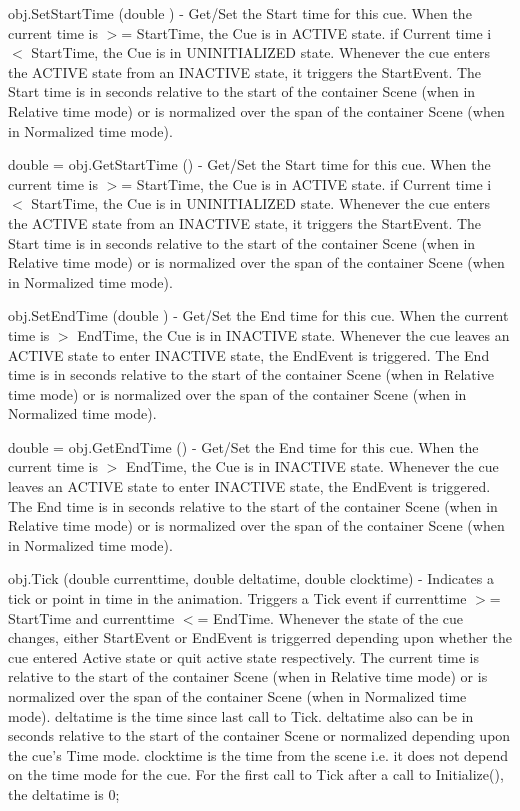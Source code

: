 \begin{DoxyItemize}
\item {\ttfamily obj.\-Set\-Start\-Time (double )} -\/ Get/\-Set the Start time for this cue. When the current time is $>$= Start\-Time, the Cue is in A\-C\-T\-I\-V\-E state. if Current time i $<$ Start\-Time, the Cue is in U\-N\-I\-N\-I\-T\-I\-A\-L\-I\-Z\-E\-D state. Whenever the cue enters the A\-C\-T\-I\-V\-E state from an I\-N\-A\-C\-T\-I\-V\-E state, it triggers the Start\-Event. The Start time is in seconds relative to the start of the container Scene (when in Relative time mode) or is normalized over the span of the container Scene (when in Normalized time mode).  
\item {\ttfamily double = obj.\-Get\-Start\-Time ()} -\/ Get/\-Set the Start time for this cue. When the current time is $>$= Start\-Time, the Cue is in A\-C\-T\-I\-V\-E state. if Current time i $<$ Start\-Time, the Cue is in U\-N\-I\-N\-I\-T\-I\-A\-L\-I\-Z\-E\-D state. Whenever the cue enters the A\-C\-T\-I\-V\-E state from an I\-N\-A\-C\-T\-I\-V\-E state, it triggers the Start\-Event. The Start time is in seconds relative to the start of the container Scene (when in Relative time mode) or is normalized over the span of the container Scene (when in Normalized time mode).  
\item {\ttfamily obj.\-Set\-End\-Time (double )} -\/ Get/\-Set the End time for this cue. When the current time is $>$ End\-Time, the Cue is in I\-N\-A\-C\-T\-I\-V\-E state. Whenever the cue leaves an A\-C\-T\-I\-V\-E state to enter I\-N\-A\-C\-T\-I\-V\-E state, the End\-Event is triggered. The End time is in seconds relative to the start of the container Scene (when in Relative time mode) or is normalized over the span of the container Scene (when in Normalized time mode).  
\item {\ttfamily double = obj.\-Get\-End\-Time ()} -\/ Get/\-Set the End time for this cue. When the current time is $>$ End\-Time, the Cue is in I\-N\-A\-C\-T\-I\-V\-E state. Whenever the cue leaves an A\-C\-T\-I\-V\-E state to enter I\-N\-A\-C\-T\-I\-V\-E state, the End\-Event is triggered. The End time is in seconds relative to the start of the container Scene (when in Relative time mode) or is normalized over the span of the container Scene (when in Normalized time mode).  
\item {\ttfamily obj.\-Tick (double currenttime, double deltatime, double clocktime)} -\/ Indicates a tick or point in time in the animation. Triggers a Tick event if currenttime $>$= Start\-Time and currenttime $<$= End\-Time. Whenever the state of the cue changes, either Start\-Event or End\-Event is triggerred depending upon whether the cue entered Active state or quit active state respectively. The current time is relative to the start of the container Scene (when in Relative time mode) or is normalized over the span of the container Scene (when in Normalized time mode). deltatime is the time since last call to Tick. deltatime also can be in seconds relative to the start of the container Scene or normalized depending upon the cue's Time mode. clocktime is the time from the scene i.\-e. it does not depend on the time mode for the cue. For the first call to Tick after a call to Initialize(), the deltatime is 0;  

\end{DoxyItemize}

